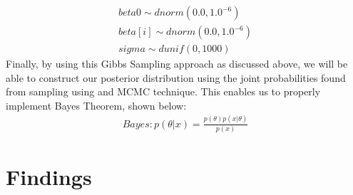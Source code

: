 \documentclass[12pt,english]{article}
\begin{document}
\begin{align*}
\label{eq:6}
    beta0 \sim dnorm(0.0, 1.0^{-6})\\
	beta[i] \sim dnorm(0.0, 1.0^{-6})\\
	sigma \sim dunif(0, 1000)
\end{align*}
Finally, by using this Gibbs Sampling approach as discussed above, we will be able to construct our posterior distribution using the joint probabilities found from sampling using and MCMC technique. This enables us to properly implement Bayes Theorem, shown below:
\begin{align*}
\label{eq:7}
    Bayes: p(\theta|x) = \frac{p(\theta)p(x|\theta)}{p(x)} 
\end{align*}



\section{Findings}\label{sec:findings}
\end{document}
